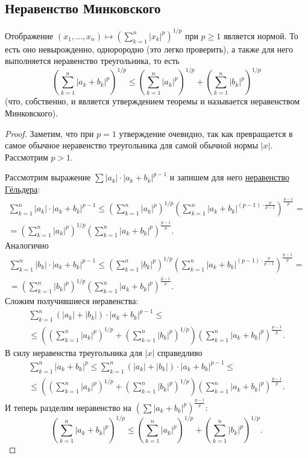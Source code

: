 \subsection{Неравенство Минковского}

\begin{ntheorem}
	Отображение \(\displaystyle (x_1, \ldots, x_n) \mapsto \left(\sum_{k=1}^n |x_k|^p \right)^{1/p}\) при \(p \geqslant 1\) является нормой. То есть оно невырожденно, однорородно (это легко проверить), а также для него выполняется неравенство треугольника, то есть \[
		\left(\sum_{k=1}^n |a_k + b_k|^p \right)^{1/p} \leqslant \left(\sum_{k=1}^n |a_k|^p \right)^{1/p} + \left(\sum_{k=1}^n |b_k|^p \right)^{1/p}
	\]
	(что, собственно, и является утверждением теоремы и называется неравенством Минковского).
\end{ntheorem}
\begin{proof}
	Заметим, что при \(p = 1\) утверждение очевидно, так как превращается в самое обычное неравенство треугольника для самой обычной нормы \(|x|\). Рассмотрим \(p > 1\).
	
	Рассмотрим выражение \(\sum |a_k| \cdot |a_k + b_k|^{p-1}\) и запишем для него \hyperlink{Гёльдер-суммы}{неравенство Гёльдера}:
	\begin{multline*}
		\sum_{k=1}^n |a_k| \cdot |a_k + b_k|^{p-1} \leqslant \left(\sum_{k=1}^n |a_k|^p \right)^{1/p} \left(\sum_{k=1}^n |a_k + b_k|^{(p - 1) \cdot \frac{p}{p-1}} \right)^{\frac{p-1}{p}} = \\
		= \left(\sum_{k=1}^n |a_k|^p \right)^{1/p} \left(\sum_{k=1}^n |a_k + b_k|^p \right)^{\frac{p-1}{p}}.
	\end{multline*}
	Аналогично
	\begin{multline*}
		\sum_{k=1}^n |b_k| \cdot |a_k + b_k|^{p-1} \leqslant \left(\sum_{k=1}^n |b_k|^p \right)^{1/p} \left(\sum_{k=1}^n |a_k + b_k|^{(p - 1) \cdot \frac{p}{p-1}} \right)^{\frac{p-1}{p}} = \\
		= \left(\sum_{k=1}^n |b_k|^p \right)^{1/p} \left(\sum_{k=1}^n |a_k + b_k|^p \right)^{\frac{p-1}{p}}.
	\end{multline*}
	Сложим получившиеся неравенства:
	\begin{multline*}
		\sum_{k=1}^n (|a_k| + |b_k|) \cdot |a_k + b_k|^{p-1} \leqslant \\
		\leqslant \left(\left(\sum_{k=1}^n |a_k|^p \right)^{1/p} + \left(\sum_{k=1}^n |b_k|^p \right)^{1/p} \right) \left(\sum_{k=1}^n |a_k + b_k|^p \right)^{\frac{p-1}{p}}.
	\end{multline*}
	В силу неравенства треугольника для \(|x|\) справедливо 
	\begin{multline*}
		\sum_{k=1}^n |a_k + b_k|^p \leqslant \sum_{k=1}^n (|a_k| + |b_k|) \cdot |a_k + b_k|^{p-1} \leqslant \\
		\leqslant \left(\left(\sum_{k=1}^n |a_k|^p \right)^{1/p} + \left(\sum_{k=1}^n |b_k|^p \right)^{1/p} \right) \left(\sum_{k=1}^n |a_k + b_k|^p \right)^{\frac{p-1}{p}}.
	\end{multline*}
	И теперь разделим неравенство на \((\sum |a_k + b_k|^p)^{\frac{p-1}{p}}\): \[
		\left(\sum_{k=1}^n |a_k + b_k|^p\right)^{1/p} \leqslant \left(\sum_{k=1}^n |a_k|^p \right)^{1/p} + \left(\sum_{k=1}^n |b_k|^p \right)^{1/p}.
	\]
\end{proof}

